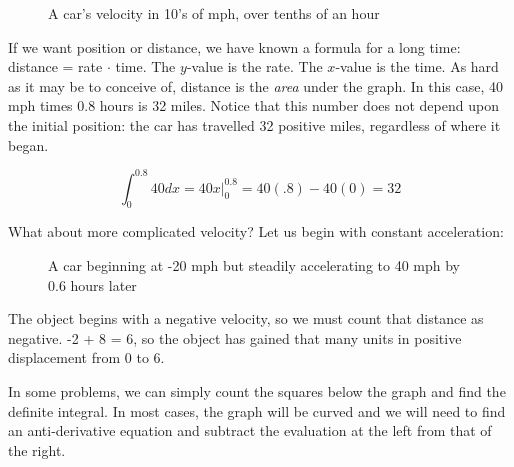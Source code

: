 \begin{figure}[h]
\begin{centering}
\caption{A car's velocity in 10's of mph, over tenths of an hour}
\end{centering}
\end{figure}


If we want position or distance, we have known a formula for a long time:
distance = rate $\cdot$ time.  The $y$-value is the rate.  The $x$-value is the 
time.  As hard as it may be to conceive of, distance is the \emph{area} under the
graph.  In this case, 40 mph times 0.8 hours is 32 miles.   Notice that this number does
not depend upon the initial position: the car has travelled 32 positive miles, regardless 
of where it began.

\begin{equation}
\int_0^{0.8}  40dx = \left.40x \right|_0^{0.8} = 40(.8) - 40(0) = 32
\end{equation}

What about more complicated velocity?  Let us begin with constant acceleration:

\begin{figure}[h]
\begin{centering}
\caption{A car beginning at -20 mph but steadily accelerating to 40 mph by 0.6 hours later}
\end{centering}
\end{figure}

The object begins with a negative velocity, so we must count that distance as negative.
-2 + 8 = 6, so the object has gained that many units in positive displacement from 0 to 6.

In some problems, we can simply count the squares below the graph and find the
definite integral.  In most cases, the graph will be curved and we will need to find an
anti-derivative equation and subtract the evaluation at the left from that of the right.

